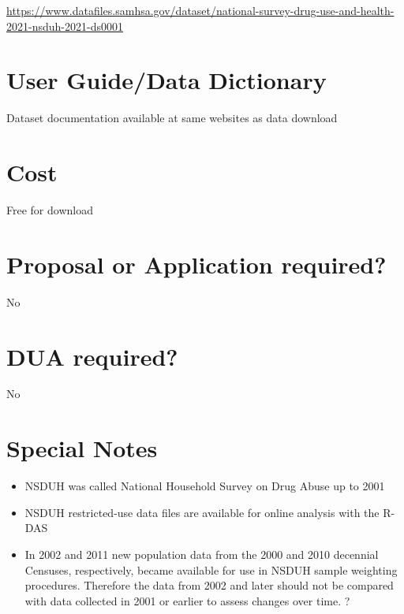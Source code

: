 \documentclass[
]{book}
\providecommand{\tightlist}{%
  \setlength{\itemsep}{0pt}\setlength{\parskip}{0pt}}
\begin{document}
\url{https://www.datafiles.samhsa.gov/dataset/national-survey-drug-use-and-health-2021-nsduh-2021-ds0001}

\hypertarget{user-guidedata-dictionary-64}{%
\section{User Guide/Data Dictionary}\label{user-guidedata-dictionary-64}}

Dataset documentation available at same websites as data download

\hypertarget{cost-64}{%
\section{Cost}\label{cost-64}}

Free for download

\hypertarget{proposal-or-application-required-64}{%
\section{Proposal or Application required?}\label{proposal-or-application-required-64}}

No

\hypertarget{dua-required-64}{%
\section{DUA required?}\label{dua-required-64}}

No

\hypertarget{special-notes-64}{%
\section{Special Notes}\label{special-notes-64}}

\begin{itemize}
\tightlist
\item
  NSDUH was called National Household Survey on Drug Abuse up to 2001
\item
  NSDUH restricted-use data files are available for online analysis with the R-DAS
\item
  In 2002 and 2011 new population data from the 2000 and 2010 decennial Censuses, respectively, became available for use in NSDUH sample weighting procedures. Therefore the data from 2002 and later should not be compared with data collected in 2001 or earlier to assess changes over time. ?
\end{itemize}
\end{document}
